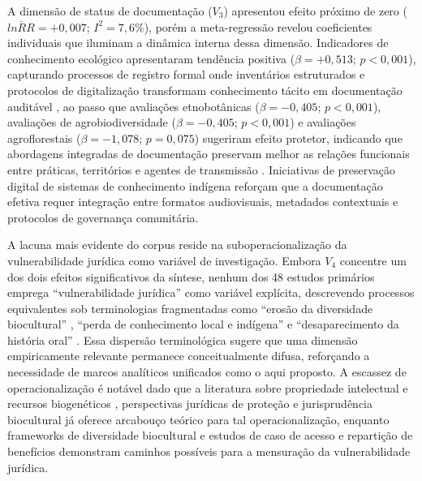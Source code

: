 A dimensão de status de documentação ($V_3$) apresentou efeito próximo de zero ($\overline{lnRR} = +0{,}007$; $I^2 = 7{,}6\%$), porém a meta-regressão revelou coeficientes individuais que iluminam a dinâmica interna dessa dimensão. Indicadores de conhecimento ecológico apresentaram tendência positiva ($\beta = +0{,}513$; $p < 0{,}001$), capturando processos de registro formal onde inventários estruturados e protocolos de digitalização transformam conhecimento tácito em documentação auditável \cite{Zeleke2025,Suwardi2025}, ao passo que avaliações etnobotânicas ($\beta = -0{,}405$; $p < 0{,}001$), avaliações de agrobiodiversidade ($\beta = -0{,}405$; $p < 0{,}001$) e avaliações agroflorestais ($\beta = -1{,}078$; $p = 0{,}075$) sugeriram efeito protetor, indicando que abordagens integradas de documentação preservam melhor as relações funcionais entre práticas, territórios e agentes de transmissão \cite{Maina2012,Poorna2014}. Iniciativas de preservação digital de sistemas de conhecimento indígena \cite{Balogun2021} reforçam que a documentação efetiva requer integração entre formatos audiovisuais, metadados contextuais e protocolos de governança comunitária.

A lacuna mais evidente do corpus reside na suboperacionalização da vulnerabilidade jurídica como variável de investigação. Embora $V_4$ concentre um dos dois efeitos significativos da síntese, nenhum dos 48 estudos primários emprega ``vulnerabilidade jurídica'' como variável explícita, descrevendo processos equivalentes sob terminologias fragmentadas como ``erosão da diversidade biocultural'' \cite{Mobarak2025}, ``perda de conhecimento local e indígena'' \cite{Suwardi2025} e ``desaparecimento da história oral'' \cite{LaRosa2021}. Essa dispersão terminológica sugere que uma dimensão empiricamente relevante permanece conceitualmente difusa, reforçando a necessidade de marcos analíticos unificados como o aqui proposto. A escassez de operacionalização é notável dado que a literatura sobre propriedade intelectual e recursos biogenéticos \cite{Dutfield2004}, perspectivas jurídicas de proteção \cite{Cottier2004} e jurisprudência biocultural \cite{BavikatteRobinson2011} já oferece arcabouço teórico para tal operacionalização, enquanto frameworks de diversidade biocultural \cite{Nemoga2022} e estudos de caso de acesso e repartição de benefícios \cite{Robinson2014} demonstram caminhos possíveis para a mensuração da vulnerabilidade jurídica.

